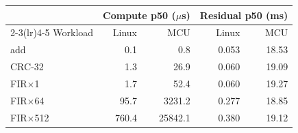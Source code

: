 \begin{tabular}{lrrrr}
\toprule
 & \multicolumn{2}{c}{Compute p50 ($\mu$s)} & \multicolumn{2}{c}{Residual p50 (ms)} \\
\cmidrule(lr){2-3}\cmidrule(lr){4-5}
Workload & Linux & MCU & Linux & MCU \\
\midrule
add & 0.1 & 0.8 & 0.053 & 18.53 \\
CRC-32 & 1.3 & 26.9 & 0.060 & 19.09 \\
FIR$\times$1 & 1.7 & 52.4 & 0.060 & 19.27 \\
FIR$\times$64 & 95.7 & 3231.2 & 0.277 & 18.85 \\
FIR$\times$512 & 760.4 & 25842.1 & 0.380 & 19.12 \\
\bottomrule
\end{tabular}
